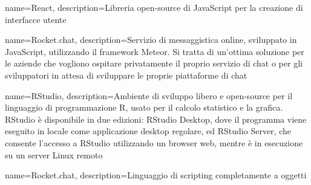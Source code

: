{
	name=React,
	description={Libreria open-source di JavaScript per la creazione di interfacce utente}
}

{
	name=Rocket.chat,
	description={Servizio di messaggistica online, sviluppato in JavaScript, utilizzando il framework Meteor. Si tratta di un'ottima soluzione per le aziende che vogliono ospitare privatamente il proprio servizio di chat o per gli sviluppatori in attesa di sviluppare le proprie piattaforme di chat}
}

{
	name=RStudio,
	description={Ambiente di sviluppo libero e open-source per il linguaggio di programmazione R, usato per il calcolo statistico e la grafica. RStudio è disponibile in due edizioni: RStudio Desktop, dove il programma viene eseguito in locale come applicazione desktop regolare, ed RStudio Server, che consente l'accesso a RStudio utilizzando un browser web, mentre è in esecuzione su un server Linux remoto}
}

{
	name=Rocket.chat,
	description={Linguaggio di scripting completamente a oggetti}
}